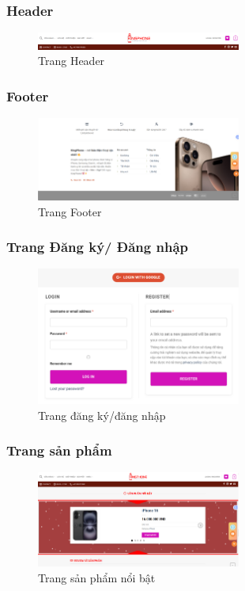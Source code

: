 \subsubsection{Header}
\begin{figure}[H]
    \centering
    \includegraphics[width=0.6\textwidth]{img/header.png}
    \caption{Trang Header}
    \label{fig:header}
\end{figure}
\subsubsection{Footer}
\begin{figure}[H]
    \centering
    \includegraphics[width=0.6\textwidth]{img/footer.png}
    \caption{Trang Footer}
    \label{fig:foter}
\end{figure}
\subsubsection{Trang Đăng ký/ Đăng nhập}
\begin{figure}[H]
    \centering
    \includegraphics[width=0.6\textwidth]{img/dangnhap.png}
    \caption{Trang đăng ký/đăng nhập}
    \label{fig:dkdn}
\end{figure}

\subsubsection{Trang sản phẩm}
\begin{figure}[H]
    \centering
    \includegraphics[width=0.6\textwidth]{img/sanpahmnoibat.png}
    \caption{Trang sản phẩm nổi bật}
    \label{fig:noibat}
\end{figure}

